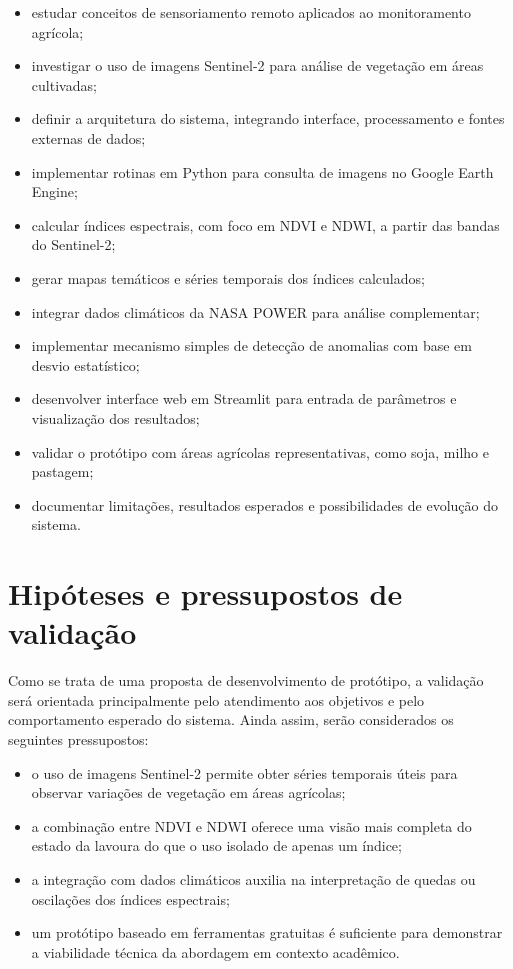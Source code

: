 \begin{itemize}[leftmargin=3em]
    \item estudar conceitos de sensoriamento remoto aplicados ao monitoramento agrícola;
    \item investigar o uso de imagens Sentinel-2 para análise de vegetação em áreas cultivadas;
    \item definir a arquitetura do sistema, integrando interface, processamento e fontes externas de dados;
    \item implementar rotinas em Python para consulta de imagens no Google Earth Engine;
    \item calcular índices espectrais, com foco em NDVI e NDWI, a partir das bandas do Sentinel-2;
    \item gerar mapas temáticos e séries temporais dos índices calculados;
    \item integrar dados climáticos da NASA POWER para análise complementar;
    \item implementar mecanismo simples de detecção de anomalias com base em desvio estatístico;
    \item desenvolver interface web em Streamlit para entrada de parâmetros e visualização dos resultados;
    \item validar o protótipo com áreas agrícolas representativas, como soja, milho e pastagem;
    \item documentar limitações, resultados esperados e possibilidades de evolução do sistema.
\end{itemize}

\section{Hipóteses e pressupostos de validação}\label{sec:hipoteses}

Como se trata de uma proposta de desenvolvimento de protótipo, a validação será orientada principalmente pelo atendimento aos objetivos e pelo comportamento esperado do sistema. Ainda assim, serão considerados os seguintes pressupostos:

\begin{itemize}[leftmargin=3em]
    \item o uso de imagens Sentinel-2 permite obter séries temporais úteis para observar variações de vegetação em áreas agrícolas;
    \item a combinação entre NDVI e NDWI oferece uma visão mais completa do estado da lavoura do que o uso isolado de apenas um índice;
    \item a integração com dados climáticos auxilia na interpretação de quedas ou oscilações dos índices espectrais;
    \item um protótipo baseado em ferramentas gratuitas é suficiente para demonstrar a viabilidade técnica da abordagem em contexto acadêmico.
\end{itemize}
